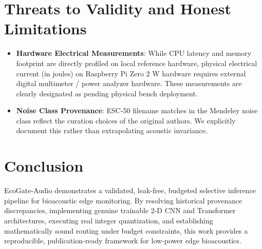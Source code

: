 \documentclass[11pt,a4paper]{article}
\begin{document}
\section{Threats to Validity and Honest Limitations}
\begin{itemize}
    \item \textbf{Hardware Electrical Measurements}: While CPU latency and memory footprint are directly profiled on local reference hardware, physical electrical current (in joules) on Raspberry Pi Zero 2 W hardware requires external digital multimeter / power analyzer hardware. These measurements are clearly designated as pending physical bench deployment.
    \item \textbf{Noise Class Provenance}: ESC-50 filename matches in the Mendeley noise class reflect the curation choices of the original authors. We explicitly document this rather than extrapolating acoustic invariance.
\end{itemize}

\section{Conclusion}
EcoGate-Audio demonstrates a validated, leak-free, budgeted selective inference pipeline for bioacoustic edge monitoring. By resolving historical provenance discrepancies, implementing genuine trainable 2-D CNN and Transformer architectures, executing real integer quantization, and establishing mathematically sound routing under budget constraints, this work provides a reproducible, publication-ready framework for low-power edge bioacoustics.



\end{document}
